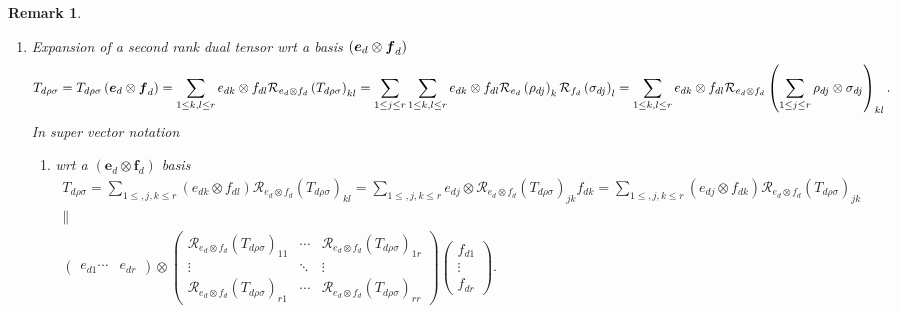 \documentclass[aps,preprint]{revtex4}
\newtheorem{remark}[theorem]{Remark}
\begin{document}
\begin{remark}
\begin{enumerate}
\item Expansion of a second rank dual tensor wrt a basis $\left( \boldsymbol{%
e}_{d}\otimes \boldsymbol{f}_{d}\right) $ 
\begin{equation}
T_{d\rho \sigma }=T_{d\rho \sigma }\left( \boldsymbol{e}_{d}\otimes 
\boldsymbol{f}_{d}\right) =\sum_{1\leq k,l\leq r}e_{dk}\otimes f_{dl}%
\mathcal{R}_{e_{d}\otimes f_{d}}\left( T_{d\rho \sigma }\right)
_{kl}=\sum_{1\leq j\leq r}\sum_{1\leq k,l\leq r}e_{dk}\otimes f_{dl}\mathcal{%
R}_{e_{d}}\left( \rho _{dj}\right) _{k}\mathcal{R}_{f_{d}}\left( \sigma
_{dj}\right) _{l}=\sum_{1\leq k,l\leq r}e_{dk}\otimes f_{dl}\mathcal{R}%
_{e_{d}\otimes f_{d}}\left( \sum_{1\leq j\leq r}\rho _{dj}\otimes \sigma
_{dj}\right) _{kl}.
\end{equation}%
In super vector notation

\begin{enumerate}
\item wrt a $\left( \boldsymbol{e}_{d}\otimes \boldsymbol{f}_{d}\right) $
basis 
\begin{gather}
T_{d\rho \sigma }=\sum_{1\leq ,j,k\leq r}\left( e_{dk}\otimes f_{dl}\right) 
\mathcal{R}_{e_{d}\otimes f_{d}}\left( T_{d\rho \sigma }\right)
_{kl}=\sum_{1\leq ,j,k\leq r}e_{dj}\otimes \mathcal{R}_{e_{d}\otimes
f_{d}}\left( T_{d\rho \sigma }\right) _{jk}f_{dk}=\sum_{1\leq ,j,k\leq
r}\left( e_{dj}\otimes f_{dk}\right) \mathcal{R}_{e_{d}\otimes f_{d}}\left(
T_{d\rho \sigma }\right) _{jk} \\
\parallel \\
\left( 
\begin{array}{cc}
e_{d1}\cdots & e_{dr}%
\end{array}%
\right) \otimes \left( 
\begin{array}{ccc}
\mathcal{R}_{e_{d}\otimes f_{d}}\left( T_{d\rho \sigma }\right) _{11} & 
\cdots & \mathcal{R}_{e_{d}\otimes f_{d}}\left( T_{d\rho \sigma }\right)
_{1r} \\ 
\vdots & \ddots & \vdots \\ 
\mathcal{R}_{e_{d}\otimes f_{d}}\left( T_{d\rho \sigma }\right) _{r1} & 
\cdots & \mathcal{R}_{e_{d}\otimes f_{d}}\left( T_{d\rho \sigma }\right)
_{rr}%
\end{array}%
\right) \left( 
\begin{array}{c}
f_{d1} \\ 
\vdots \\ 
f_{dr}%
\end{array}%
\right) .
\end{gather}


\end{enumerate}
\end{enumerate}
\end{remark}
\end{document}

